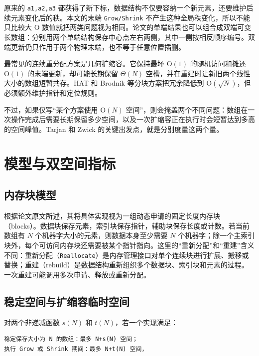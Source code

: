 \documentclass[UTF8,11pt,a4paper]{ctexart}
\begin{document}
原来的 \textnormal{\texttt{a1,a2,a3}} 都获得了新下标，数据结构不仅要容纳一个新元素，还要维护后续元素变化后的秩。本文的末端 \textnormal{\texttt{Grow/Shrink}} 不产生这种全局秩变化，所以不能只比较大 O 数值就把两类问题视为相同。论文的单端结果也可以组合成双端可变长数组：分别用两个单端结构保存中心点左右两侧，其中一侧按相反顺序编号。双端更新仍只作用于两个物理末端，也不等于任意位置插删。\par

最常见的连续重分配方案是几何扩缩容。它保持最坏 $\mathrm{O}(1)$ 的随机访问和摊还 $\mathrm{O}(1)$ 的末端更新，却可能长期保留 $\Theta(N)$ 空槽，并在重建时让新旧两个线性大小的数组短暂共存。HAT 和 Brodnik 等分块方案把冗余降低到 $\mathrm{O}(\sqrt{N})$，但必须额外维护指针和定位规则。\par

不过，如果仅写“某个方案使用 $\mathrm{O}(N)$ 空间”，则会掩盖两个不同问题：数组在一次操作完成后需要长期保留多少空间，以及一次扩缩容正在执行时会短暂达到多高的空间峰值。Tarjan 和 Zwick 的关键出发点，就是分别度量这两个量。\par

\section{模型与双空间指标}

\subsection{内存块模型}

根据论文原文所述，其将具体实现视为一组动态申请的固定长度内存块（blocks）。数据块保存元素，索引块保存指针，辅助块保存长度或计数。若当前数组有 $N$ 个机器字大小的元素，则数据本身至少需要 $N$ 个机器字；除一个主索引块外，每个可访问内存块还需要被某个指针指向。这里的“重新分配”和“重建”含义不同：重新分配（\textnormal{\texttt{Reallocate}}）是内存管理接口对单个连续块进行扩展、搬移或替换；重建（rebuild）是数据结构重新组织多个数据块、索引块和元素的过程。一次重建可能调用多次申请、释放或重新分配。\par

\subsection{稳定空间与扩缩容临时空间}

对两个非递减函数 $s(N)$ 和 $t(N)$，若一个实现满足：\par

\begin{Verbatim}[fontsize=\scriptsize]
稳定保存大小为 N 的数组：最多 N+s(N) 空间；
执行 Grow 或 Shrink 期间：最多 N+t(N) 空间，
\end{Verbatim}
\end{document}
